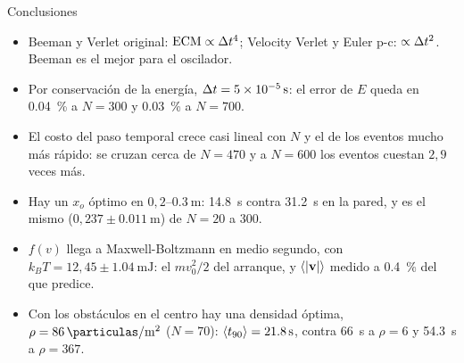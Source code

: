 \documentclass[aspectratio=169,11pt]{beamer}
\begin{document}
\begin{frame}{Conclusiones}
    \vspace{0.1em}
    \begin{itemize}\setlength{\itemsep}{0.75em}
        \item Beeman y Verlet original: $\mathrm{ECM} \propto \Delta t^{4}$; Velocity Verlet
              y Euler p-c: $\propto \Delta t^{2}$. Beeman es el mejor para el oscilador.
        \item Por conservación de la energía, $\Delta t = \SI{5e-5}{\second}$: el error
              de $E$ queda en \SI{0.04}{\percent} a $N = 300$ y \SI{0.03}{\percent}
              a $N = 700$.
        \item El costo del paso temporal crece casi lineal con $N$ y el de los eventos
              mucho más rápido: se cruzan cerca de $N = 470$ y a $N = 600$ los eventos
              cuestan $2{,}9$ veces más.
        \item Hay un $x_o$ \alert{óptimo} en $0{,}2$--$\SI{0.3}{\meter}$:
              \SI{14.8}{\second} contra \SI{31.2}{\second} en la pared, y es el mismo
              ($0{,}237 \pm \SI{0.011}{\meter}$) de $N = 20$ a $300$.
        \item $f(v)$ llega a Maxwell-Boltzmann en medio segundo, con
              $k_BT = 12{,}45 \pm \SI{1.04}{\milli\joule}$: el $m v_0^2/2$ del
              arranque, y $\langle |\mathbf{v}| \rangle$ medido a \SI{0.4}{\percent} del que predice.
        \item Con los obstáculos en el centro hay una densidad óptima,
              $\rho = \SI{86}{\particulas\per\meter\squared}$ ($N = 70$):
              $\langle t_{90}\rangle = \SI{21.8}{\second}$, contra \SI{66}{\second} a
              $\rho = 6$ y \SI{54.3}{\second} a $\rho = 367$.
    \end{itemize}
\end{frame}
\end{document}
